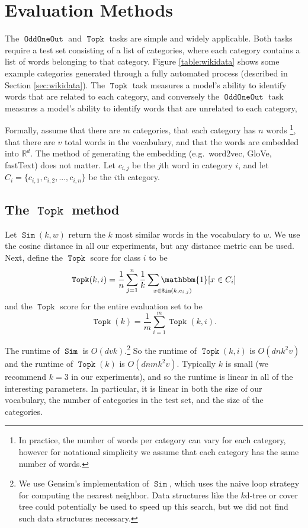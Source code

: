 \documentclass[11pt,a4paper]{article}
\newcommand{\indicator}[1]{\mathbbm{1}\!\left[{#1}\right]}
\DeclareMathOperator{\FindMostSimilar}{\texttt{Sim}}
\DeclareMathOperator{\OddOneOut}{\texttt{OddOneOut}}
\DeclareMathOperator{\topk}{\texttt{Topk}}
\newcommand{\fixme}[1]{{\color{red}\itshape \textbf{FIXME:} {#1}}}
\begin{document}
\section{Evaluation Methods}
\label{sec:method}
The $\OddOneOut$ and $\topk$ tasks are simple and widely applicable.
Both tasks require a test set consisting of a list of categories,
where each category contains a list of words belonging to that category.
Figure \ref{table:wikidata} shows some example categories generated through a fully automated process (described in Section \ref{sec:wikidata}).
The $\topk$ task measures a model's ability to identify words that are related to each category,
and conversely the $\OddOneOut$ task measures a model's ability to identify words that are unrelated to each category,

Formally,
assume that there are $m$ categories,
that each category has $n$ words%
\footnote{
    In practice, the number of words per category can vary for each category,
    however for notational simplicity we assume that each category has the same number of words.
},
that there are $v$ total words in the vocabulary,
and that the words are embedded into $\mathbb {R}^d$.
The method of generating the embedding (e.g.\ word2vec, GloVe, fastText) does not matter.
Let $c_{i,j}$ be the $j$th word in category $i$,
and let $C_i = \{c_{i,1}, c_{i,2}, ..., c_{i,n}\}$ be the $i$th category.

\subsection{The $\topk$ method}
Let $\FindMostSimilar(k,w)$ return the $k$ most similar words in the vocabulary to $w$.
We use the cosine distance in all our experiments,
but any distance metric can be used.
Next, define the $\topk$ score for class $i$ to be
\begin{equation}
    \topk(k,i) = \frac{1}{n}\sum_{j=1}^n \frac{1}{k}\sum_{\mathrlap{x \in \FindMostSimilar(k, c_{i,j})}} \indicator{x \in C_i}
\end{equation}
and the $\topk$ score for the entire evaluation set to be
\begin{equation}
    \topk(k) = \frac{1}{m}\sum_{i=1}^m \topk(k,i)
    .
\end{equation}

The runtime of $\FindMostSimilar$ is $O(dvk)$.\footnote{
    We use Gensim's implementation of $\FindMostSimilar$,
    which uses the naive loop strategy for computing the nearest neighbor.
    Data structures like the $k$d-tree or cover tree could potentially be used to speed up this search,
    but we did not find such data structures necessary.
}
So the runtime of $\topk(k,i)$ is $O(dnk^2v)$
and the runtime of $\topk(k)$ is $O(dnmk^2v)$.
Typically $k$ is small (we recommend $k=3$ in our experiments),
and so the runtime is linear in all of the interesting parameters.
In particular, it is linear in both the size of our vocabulary, the number of categories in the test set, and the size of the categories.
\end{document}
